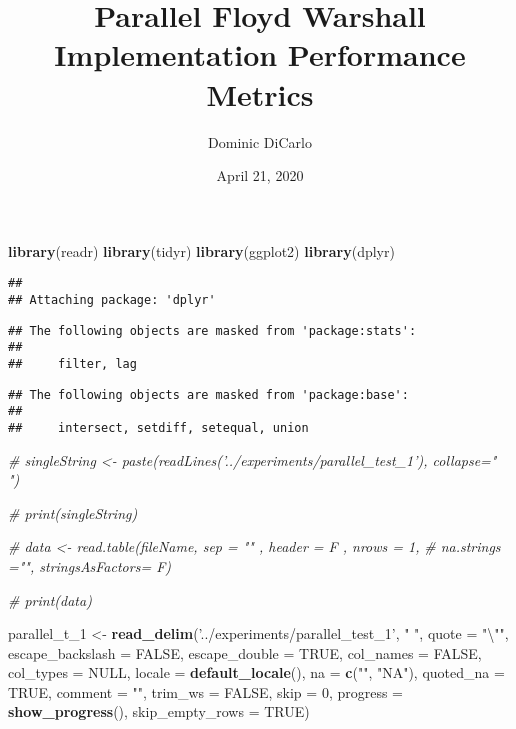 \documentclass[]{article}
\title{Parallel Floyd Warshall Implementation Performance Metrics}
\author{Dominic DiCarlo}
\date{April 21, 2020}
\newenvironment{Shaded}{\begin{snugshade}}{\end{snugshade}}
\newcommand{\KeywordTok}[1]{\textcolor[rgb]{0.13,0.29,0.53}{\textbf{#1}}}
\newcommand{\DataTypeTok}[1]{\textcolor[rgb]{0.13,0.29,0.53}{#1}}
\newcommand{\DecValTok}[1]{\textcolor[rgb]{0.00,0.00,0.81}{#1}}
\newcommand{\CharTok}[1]{\textcolor[rgb]{0.31,0.60,0.02}{#1}}
\newcommand{\StringTok}[1]{\textcolor[rgb]{0.31,0.60,0.02}{#1}}
\newcommand{\CommentTok}[1]{\textcolor[rgb]{0.56,0.35,0.01}{\textit{#1}}}
\newcommand{\OtherTok}[1]{\textcolor[rgb]{0.56,0.35,0.01}{#1}}
\newcommand{\NormalTok}[1]{#1}
\begin{document}
\maketitle

\begin{Shaded}
\begin{Highlighting}[]
\KeywordTok{library}\NormalTok{(readr)}
\KeywordTok{library}\NormalTok{(tidyr)}
\KeywordTok{library}\NormalTok{(ggplot2)}
\KeywordTok{library}\NormalTok{(dplyr)}
\end{Highlighting}
\end{Shaded}

\begin{verbatim}
## 
## Attaching package: 'dplyr'
\end{verbatim}

\begin{verbatim}
## The following objects are masked from 'package:stats':
## 
##     filter, lag
\end{verbatim}

\begin{verbatim}
## The following objects are masked from 'package:base':
## 
##     intersect, setdiff, setequal, union
\end{verbatim}

\begin{Shaded}
\begin{Highlighting}[]
\CommentTok{# singleString <- paste(readLines('../experiments/parallel_test_1'), collapse=" ")}

\CommentTok{# print(singleString)}

\CommentTok{# data <- read.table(fileName, sep = "" , header = F , nrows = 1,}
\CommentTok{#                     na.strings ="", stringsAsFactors= F)}


\CommentTok{# print(data)}

\NormalTok{parallel_t_}\DecValTok{1}\NormalTok{ <-}\StringTok{ }\KeywordTok{read_delim}\NormalTok{(}\StringTok{'../experiments/parallel_test_1'}\NormalTok{, }\StringTok{" "}\NormalTok{, }\DataTypeTok{quote =} \StringTok{"}\CharTok{\textbackslash{}"}\StringTok{"}\NormalTok{, }\DataTypeTok{escape_backslash =} \OtherTok{FALSE}\NormalTok{,}
  \DataTypeTok{escape_double =} \OtherTok{TRUE}\NormalTok{, }\DataTypeTok{col_names =} \OtherTok{FALSE}\NormalTok{, }\DataTypeTok{col_types =} \OtherTok{NULL}\NormalTok{,}
  \DataTypeTok{locale =} \KeywordTok{default_locale}\NormalTok{(), }\DataTypeTok{na =} \KeywordTok{c}\NormalTok{(}\StringTok{""}\NormalTok{, }\StringTok{"NA"}\NormalTok{), }\DataTypeTok{quoted_na =} \OtherTok{TRUE}\NormalTok{,}
  \DataTypeTok{comment =} \StringTok{""}\NormalTok{, }\DataTypeTok{trim_ws =} \OtherTok{FALSE}\NormalTok{, }\DataTypeTok{skip =} \DecValTok{0}\NormalTok{, }
 \DataTypeTok{progress =} \KeywordTok{show_progress}\NormalTok{(),}
  \DataTypeTok{skip_empty_rows =} \OtherTok{TRUE}\NormalTok{)}
\end{Highlighting}
\end{Shaded}
\end{document}
